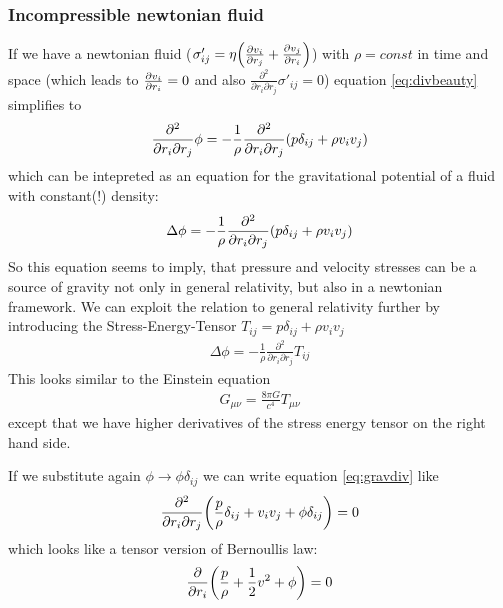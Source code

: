  
\subsubsection{Incompressible newtonian fluid}
If we have a newtonian fluid 
($\sigma'_{ij}=\eta \lra{\ppd{r_j}{v_i}+\ppd{r_i}{v_j}}$) with $\rho=const$ in 
time and space (which leads to $\ppd{r_i}{v_i}=0$ and also
$\frac{\partial^2}{\partial r_i \partial r_j}\sigma'_{ij}=0$) 
equation \eqref{eq:divbeauty} simplifies to
\begin{align}
\frac{\partial^2}{\partial r_i \partial r_j}\phi = 
- \frac{1}{\rho} \frac{\partial^2}{\partial r_i \partial r_j} \lra{p \delta_{ij} + \rho v_i v_j}
\end{align}
which can be intepreted as an equation for the gravitational potential of a 
fluid with constant(!) density:
\begin{align}
\Delta \phi = - \frac{1}{\rho} \frac{\partial^2}{\partial r_i \partial r_j} 
\lra{p \delta_{ij} + \rho v_i v_j}
\end{align}
So this equation seems to imply, that pressure and velocity stresses can be a 
source of gravity not only in general relativity, but also in a newtonian 
framework. We can exploit the relation to general relativity further by 
introducing the Stress-Energy-Tensor $T_{ij} = p \delta_{ij} + \rho v_i v_j $ 
\begin{align}
\Delta \phi = - \frac{1}{\rho} \frac{\partial^2}{\partial r_i \partial r_j} T_{ij} \label{eq:gravdiv}
\end{align}
This looks similar to the Einstein equation
\begin{align}
G_{\mu \nu} = \frac{8\pi G}{c^4} T_{\mu \nu}
\end{align}
except that we have higher derivatives of the stress energy tensor on the 
right hand side. 

If we substitute again $\phi \rightarrow \phi \delta_{ij}$ we can write equation 
\eqref{eq:gravdiv} like
\begin{align}
\frac{\partial^2}{\partial r_i \partial r_j} 
\lra{\frac{p}{\rho} \delta_{ij} + v_i v_j +  \phi \delta_{ij}}=0
\end{align}
which looks like a tensor version of Bernoullis law:
\begin{align}
\pd{r_i}\lra{\frac{p}{\rho} + \frac{1}{2} v^2 +  \phi} = 0
\end{align}

